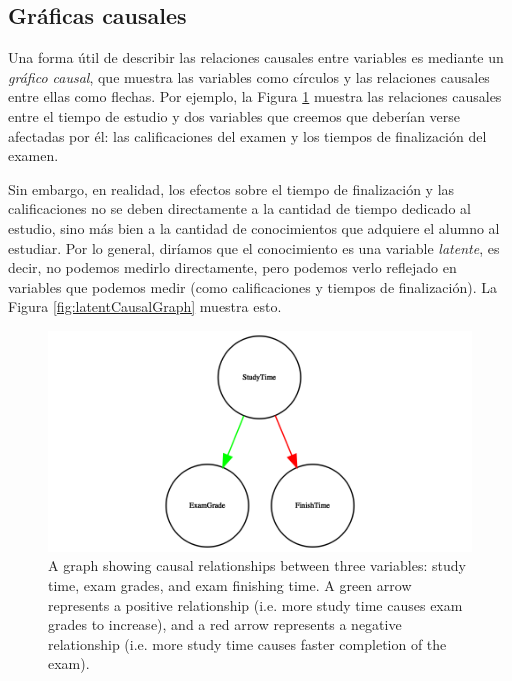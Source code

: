 \documentclass[
  12pt,
]{book}
\begin{document}
\hypertarget{gruxe1ficas-causales}{%
\subsection{Gráficas causales}\label{gruxe1ficas-causales}}

Una forma útil de describir las relaciones causales entre variables es mediante un \emph{gráfico causal}, que muestra las variables como círculos y las relaciones causales entre ellas como flechas. Por ejemplo, la Figura \ref{fig:simpleCausalGraph} muestra las relaciones causales entre el tiempo de estudio y dos variables que creemos que deberían verse afectadas por él: las calificaciones del examen y los tiempos de finalización del examen.

Sin embargo, en realidad, los efectos sobre el tiempo de finalización y las calificaciones no se deben directamente a la cantidad de tiempo dedicado al estudio, sino más bien a la cantidad de conocimientos que adquiere el alumno al estudiar. Por lo general, diríamos que el conocimiento es una variable \emph{latente}, es decir, no podemos medirlo directamente, pero podemos verlo reflejado en variables que podemos medir (como calificaciones y tiempos de finalización). La Figura \ref{fig:latentCausalGraph} muestra esto.

\begin{figure}
\includegraphics[width=13.33in,height=0.5\textheight]{images/dag_example} \caption{A graph showing causal relationships between three variables: study time, exam grades, and exam finishing time.  A green arrow represents a positive relationship (i.e. more study time causes exam grades to increase), and a red arrow represents a negative relationship (i.e. more study time causes faster completion of the exam).}\label{fig:simpleCausalGraph}
\end{figure}
\end{document}
